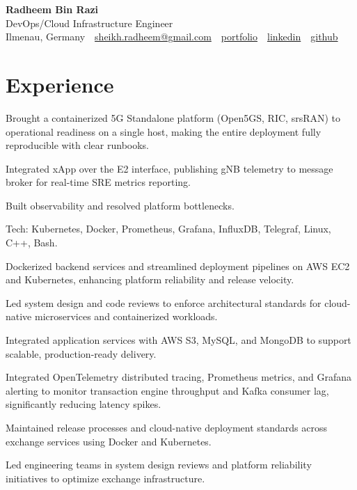 \documentclass[10pt,a4paper]{resume}
\makeatletter
\newcommand{\Portfolio}{https://radheem.github.io/my-cv}
\newcommand{\PortfolioText}{portfolio}
\newcommand{\GitHub}{https://github.com/radheem}
\newcommand{\LinkedIn}{https://www.linkedin.com/in/radheem-razi}
\newcommand{\Email}{sheikh.radheem@gmail.com}
\makeatother
\begin{document}
\begin{center}
  {\huge\bfseries Radheem Bin Razi}\\[3pt]
  {\large DevOps/Cloud Infrastructure Engineer}\\[6pt]
  \small
  Ilmenau, Germany \,\textbar\,
  \href{mailto:\Email}{\Email} \,\textbar\,
  \href{\Portfolio}{\PortfolioText} \,\textbar\,
  \href{\LinkedIn}{linkedin} \,\textbar\,
  \href{\GitHub}{github}
\end{center}
\vspace{2pt}

\section{Experience}

\bullets
  \item Brought a containerized 5G Standalone platform (Open5GS, RIC, srsRAN) to operational readiness on a single host, making the entire deployment fully reproducible with clear runbooks.
  \item Integrated xApp over the E2 interface, publishing gNB telemetry to message broker for real-time SRE metrics reporting.
  \item Built observability and resolved platform bottlenecks.
  \item Tech: Kubernetes, Docker, Prometheus, Grafana, InfluxDB, Telegraf, Linux, C++, Bash.
\bulletsend
\vspace{1.5pt}
\bullets
  \item Dockerized backend services and streamlined deployment pipelines on AWS EC2 and Kubernetes, enhancing platform reliability and release velocity.
  \item Led system design and code reviews to enforce architectural standards for cloud-native microservices and containerized workloads.
  \item Integrated application services with AWS S3, MySQL, and MongoDB to support scalable, production-ready delivery.
\bulletsend
\vspace{1.5pt}
\bullets
  \item Integrated OpenTelemetry distributed tracing, Prometheus metrics, and Grafana alerting to monitor transaction engine throughput and Kafka consumer lag, significantly reducing latency spikes.
  \item Maintained release processes and cloud-native deployment standards across exchange services using Docker and Kubernetes.
  \item Led engineering teams in system design reviews and platform reliability initiatives to optimize exchange infrastructure.
\bulletsend
\vspace{1.5pt}
\end{document}
